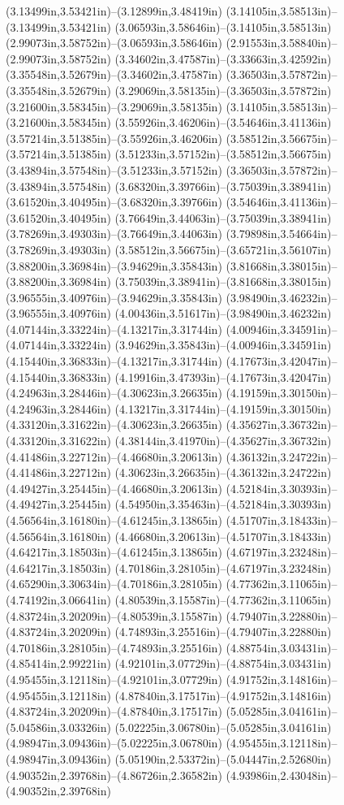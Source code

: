 (3.13499in,3.53421in)--(3.12899in,3.48419in) (3.14105in,3.58513in)--(3.13499in,3.53421in) (3.06593in,3.58646in)--(3.14105in,3.58513in) (2.99073in,3.58752in)--(3.06593in,3.58646in) (2.91553in,3.58840in)--(2.99073in,3.58752in) (3.34602in,3.47587in)--(3.33663in,3.42592in) (3.35548in,3.52679in)--(3.34602in,3.47587in) (3.36503in,3.57872in)--(3.35548in,3.52679in) (3.29069in,3.58135in)--(3.36503in,3.57872in) (3.21600in,3.58345in)--(3.29069in,3.58135in) (3.14105in,3.58513in)--(3.21600in,3.58345in) (3.55926in,3.46206in)--(3.54646in,3.41136in) (3.57214in,3.51385in)--(3.55926in,3.46206in) (3.58512in,3.56675in)--(3.57214in,3.51385in) (3.51233in,3.57152in)--(3.58512in,3.56675in) (3.43894in,3.57548in)--(3.51233in,3.57152in) (3.36503in,3.57872in)--(3.43894in,3.57548in) (3.68320in,3.39766in)--(3.75039in,3.38941in) (3.61520in,3.40495in)--(3.68320in,3.39766in) (3.54646in,3.41136in)--(3.61520in,3.40495in) (3.76649in,3.44063in)--(3.75039in,3.38941in) (3.78269in,3.49303in)--(3.76649in,3.44063in) (3.79898in,3.54664in)--(3.78269in,3.49303in) (3.58512in,3.56675in)--(3.65721in,3.56107in) (3.88200in,3.36984in)--(3.94629in,3.35843in) (3.81668in,3.38015in)--(3.88200in,3.36984in) (3.75039in,3.38941in)--(3.81668in,3.38015in) (3.96555in,3.40976in)--(3.94629in,3.35843in) (3.98490in,3.46232in)--(3.96555in,3.40976in) (4.00436in,3.51617in)--(3.98490in,3.46232in) (4.07144in,3.33224in)--(4.13217in,3.31744in) (4.00946in,3.34591in)--(4.07144in,3.33224in) (3.94629in,3.35843in)--(4.00946in,3.34591in) (4.15440in,3.36833in)--(4.13217in,3.31744in) (4.17673in,3.42047in)--(4.15440in,3.36833in) (4.19916in,3.47393in)--(4.17673in,3.42047in) (4.24963in,3.28446in)--(4.30623in,3.26635in) (4.19159in,3.30150in)--(4.24963in,3.28446in) (4.13217in,3.31744in)--(4.19159in,3.30150in) (4.33120in,3.31622in)--(4.30623in,3.26635in) (4.35627in,3.36732in)--(4.33120in,3.31622in) (4.38144in,3.41970in)--(4.35627in,3.36732in) (4.41486in,3.22712in)--(4.46680in,3.20613in) (4.36132in,3.24722in)--(4.41486in,3.22712in) (4.30623in,3.26635in)--(4.36132in,3.24722in) (4.49427in,3.25445in)--(4.46680in,3.20613in) (4.52184in,3.30393in)--(4.49427in,3.25445in) (4.54950in,3.35463in)--(4.52184in,3.30393in) (4.56564in,3.16180in)--(4.61245in,3.13865in) (4.51707in,3.18433in)--(4.56564in,3.16180in) (4.46680in,3.20613in)--(4.51707in,3.18433in) (4.64217in,3.18503in)--(4.61245in,3.13865in) (4.67197in,3.23248in)--(4.64217in,3.18503in) (4.70186in,3.28105in)--(4.67197in,3.23248in) (4.65290in,3.30634in)--(4.70186in,3.28105in) (4.77362in,3.11065in)--(4.74192in,3.06641in) (4.80539in,3.15587in)--(4.77362in,3.11065in) (4.83724in,3.20209in)--(4.80539in,3.15587in) (4.79407in,3.22880in)--(4.83724in,3.20209in) (4.74893in,3.25516in)--(4.79407in,3.22880in) (4.70186in,3.28105in)--(4.74893in,3.25516in) (4.88754in,3.03431in)--(4.85414in,2.99221in) (4.92101in,3.07729in)--(4.88754in,3.03431in) (4.95455in,3.12118in)--(4.92101in,3.07729in) (4.91752in,3.14816in)--(4.95455in,3.12118in) (4.87840in,3.17517in)--(4.91752in,3.14816in) (4.83724in,3.20209in)--(4.87840in,3.17517in) (5.05285in,3.04161in)--(5.04586in,3.03326in) (5.02225in,3.06780in)--(5.05285in,3.04161in) (4.98947in,3.09436in)--(5.02225in,3.06780in) (4.95455in,3.12118in)--(4.98947in,3.09436in) (5.05190in,2.53372in)--(5.04447in,2.52680in) (4.90352in,2.39768in)--(4.86726in,2.36582in) (4.93986in,2.43048in)--(4.90352in,2.39768in) 